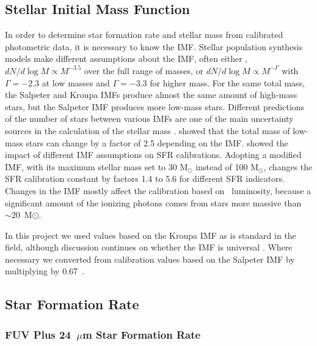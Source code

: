\subsection{Stellar Initial Mass Function}
\label{sec: imf_sfl}
In order to determine star formation rate and stellar mass from calibrated photometric data, it is necessary to know the IMF. 
Stellar population synthesis models make different assumptions about the IMF, often either \citet{Salpeter55},
$ dN / d \log M \propto M^{-3.5 }$ over the full range of masses, or 
\citet{Kroupa01} $ dN / d \log M \propto M^{-\Gamma }$ 
with $\Gamma=-2.3$ at low masses and  $\Gamma=-3.3$ for higher mass.
For the same total mass, the Salpeter and Kroupa IMFs produce almost the same amount of high-mass stars, but the Salpeter IMF produces more low-mass stars. Different predictions of the number of stars between various IMFs are one of the main uncertainty sources in the calculation of the stellar mass \citep{Eskew12,Brewer12}. \citet{Eskew12} showed that the total mass of low-mass stars can change by a factor of 2.5 depending on the IMF.
\citet{Calzetti13} showed the impact of different IMF assumptions on SFR calibrations. Adopting a modified \citet{Kroupa01} IMF, with its maximum stellar mass set to 30 M$_{\odot}$ instead of 100 M$_{\odot}$, changes the SFR calibration constant by factors 1.4 to 5.6 for different SFR indicators. Changes in the IMF mostly affect the calibration based on \halpha\ luminosity, because a significant amount of the ionizing photons comes from stars more massive than $\sim 20$~M$\odot$.

In this project we used values based on the Kroupa IMF as is standard in the field, although discussion continues on whether the IMF is universal \citep{Bastin10}. Where necessary we converted from calibration values based on the Salpeter IMF by multiplying by 0.67~\citep{Madau14}.



\subsection{Star Formation Rate}
\label{sec:sfr}
\subsubsection{FUV Plus 24~$\mu$m Star Formation Rate}


